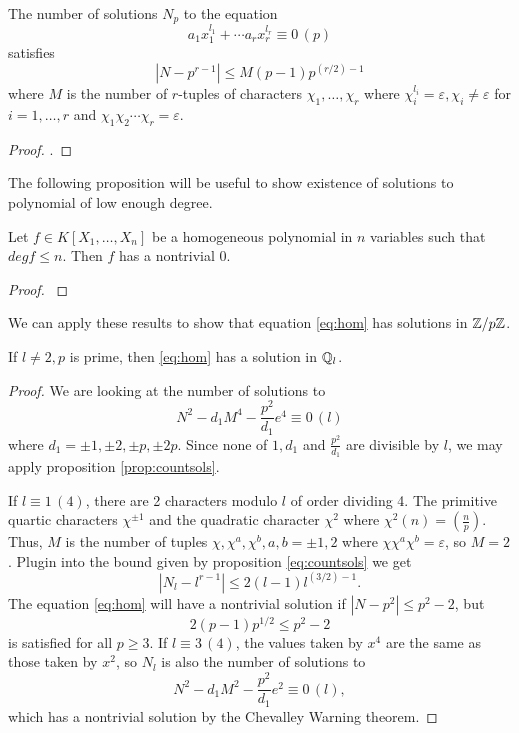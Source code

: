 \documentclass[12pt, a4paper]{amsart}
\begin{document}
\begin{prop} 
  The number of solutions $N_p$ to the equation
  \[a_1x_1^{l_1} + \cdots a_rx_r^{l_r} \equiv 0 \, (p)\]
  satisfies
  \begin{equation} 
    |N - p^{r-1}| \leq M(p-1)p^{(r/2)-1}
  \end{equation} 
  where $M$ is the number of $r$-tuples
  of characters \linebreak
  $\chi_1, \dots , \chi_r$
  where $\chi_i^{l_i} = \varepsilon, \chi_i \neq \varepsilon$ for
  $i = 1, \dots, r$ and $\chi_1 \chi_2 \cdots \chi_r = \varepsilon$.
\end{prop} \label{prop:countsols}
\begin{proof}
  \cite[See][Chapter 8-7, page 103]{classical}.
\end{proof}

The following proposition will be useful to show existence of solutions to
polynomial of low enough degree.

\begin{prop}
  Let $f \in K[X_1, \dots , X_n]$ be a homogeneous polynomial
  in $n$ variables such that $deg f \leq n$. Then $f$ has a nontrivial 0.
\end{prop}

\begin{proof}
  \cite[See][Chapter 1, page 5]{Serre}
\end{proof}

We can apply these results to show that equation \ref{eq:hom} has solutions
in ${\mathbb Z}/p{\mathbb Z}$.

\begin{lemma}
  If $l \neq 2, p$ is prime, then \ref{eq:hom} has a solution in ${\mathbb Q}_l$.
\end{lemma}
\begin{proof}
  We are looking at the number of solutions to
  \[ N^2 - d_1M^4 - \frac{p^2}{d_1}e^4 \equiv 0 \, (l)\]
  where $d_1 = \pm 1, \pm 2, \pm p, \pm 2p$. Since none of $1, d_1$ and
  $\frac{p^2}{d_1}$ are divisible by $l$, we may apply
  proposition \ref{prop:countsols}.
  
  If $l \equiv 1 \, (4)$, there are 2 characters modulo
  $l$ of order dividing 4. The primitive quartic
  characters $\chi^{\pm 1}$ and the quadratic character $\chi^2$ where $\chi^2(n) =
  (\frac{n}{p})$. Thus, $M$ is the number of tuples $\chi, \chi^a, \chi^b,
  a,b = \pm 1, 2$ where $\chi \chi^a \chi^b = \varepsilon$, so $M = 2$. Plugin
  into the bound given by proposition \ref{eq:countsols} we get
  \[|N_l - l^{r-1} | \leq 2(l-1) l^{(3/2)-1}.\]
  The equation \ref{eq:hom} will have a nontrivial solution if $|N-p^2| \leq
  p^2-2$, but
  \[2(p-1)p^{1/2} \leq p^2 - 2\]
  is satisfied for all $p \geq 3$.
  If $l \equiv 3 \, (4)$, the values taken by $x^4$ are the same as those taken
  by $x^2$, so $N_l$ is also the number of solutions to
  \[N^2 - d_1M^2 - \frac{p^2}{d_1} e^2 \equiv 0 \, (l),\]
  which has a nontrivial solution by the Chevalley Warning theorem. 
\end{proof}
\end{document}
